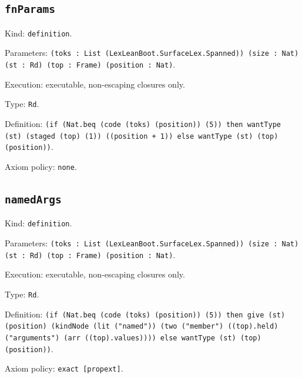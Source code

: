 \documentclass[11pt]{article}
\begin{document}
\subsection*{\texttt{fnParams}}
\noindent Kind: \texttt{definition}.\par
\noindent Parameters: \texttt{(toks : List (LexLeanBoot.SurfaceLex.Spanned)) (size : Nat) (st : Rd) (top : Frame) (position : Nat)}.\par
\noindent Execution: executable, non-escaping closures only.\par
\noindent Type: \texttt{Rd}.\par
\noindent Definition: \texttt{(if (Nat.beq (code (toks) (position)) (5)) then wantType (st) (staged (top) (1)) ((position + 1)) else wantType (st) (top) (position))}.\par
\noindent Axiom policy: \texttt{none}.\par
\subsection*{\texttt{namedArgs}}
\noindent Kind: \texttt{definition}.\par
\noindent Parameters: \texttt{(toks : List (LexLeanBoot.SurfaceLex.Spanned)) (size : Nat) (st : Rd) (top : Frame) (position : Nat)}.\par
\noindent Execution: executable, non-escaping closures only.\par
\noindent Type: \texttt{Rd}.\par
\noindent Definition: \texttt{(if (Nat.beq (code (toks) (position)) (5)) then give (st) (position) (kindNode (lit ("named")) (two ("member") ((top).held) ("arguments") (arr ((top).values)))) else wantType (st) (top) (position))}.\par
\noindent Axiom policy: \texttt{exact [propext]}.\par
\end{document}
